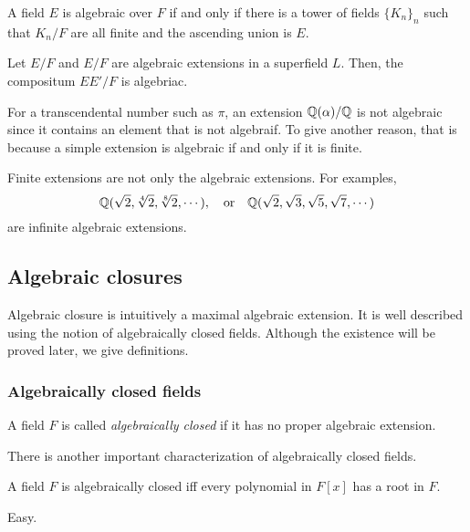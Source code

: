 \documentclass{../exp}
\begin{document}
\begin{thm}
A field $E$ is algebraic over $F$ if and only if there is a tower of fields $\{K_n\}_n$ such that $K_n/F$ are all finite and the ascending union is $E$.
\end{thm}
\begin{pf}
\end{pf}

\begin{thm}
Let $E/F$ and $E/F$ are algebraic extensions in a superfield $L$.
Then, the compositum $EE'/F$ is algebriac.
\end{thm}
\begin{pf}
\end{pf}


\begin{ex}
For a transcendental number such as $\pi$, an extension $\mathbb{Q}(\alpha)/\mathbb{Q}$ is not algebraic since it contains an element that is not algebraif.
To give another reason, that is because a simple extension is algebraic if and only if it is finite.
\end{ex}
\begin{ex}
Finite extensions are not only the algebraic extensions.
For examples,
\[\mathbb{Q}(\sqrt2,\sqrt[4]2,\sqrt[8]2,\cdots),\quad\text{or}\quad\mathbb{Q}(\sqrt2,\sqrt3,\sqrt5,\sqrt7,\cdots)\]
are infinite algebraic extensions.
\end{ex}








\subsection{Algebraic closures}

Algebraic closure is intuitively a maximal algebraic extension.
It is well described using the notion of algebraically closed fields.
Although the existence will be proved later, we give definitions.

\subsubsection{Algebraically closed fields}
\begin{defn}
A field $F$ is called \emph{algebraically closed} if it has no proper algebraic extension.
\end{defn}

There is another important characterization of algebraically closed fields.

\begin{prop}
A field $F$ is algebraically closed iff every polynomial in $F[x]$ has a root in $F$.
\end{prop}
\begin{pf}
Easy.
\end{pf}
\end{document}
